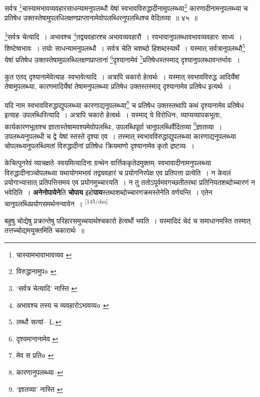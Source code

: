 \documentclass[article,12pt,a4paper]{memoir}
\begin{document}
	  \pstart सर्वत्र \footnote{चास्यामभावाभावव्यव \cite{dp-edE}}चास्यामभावव्यवहारसाधन्यामनुपलब्धौ येषां स्वभावविरुद्धादीनामुपलब्ध्या\footnote{विरुद्धानामुप० \cite{dp-msC}} कारणादीनामनुपलब्ध्या च प्रतिषेध उक्तस्तेषामुपलधिलक्षणप्राप्तानामेवोपलब्धिरनुपलब्धिश्च वेदितव्या ॥ ४५ ॥
	\pend
       

	  \pstart \footnote{‘सर्वत्र चेत्यादि’ नास्ति \cite{dp-edH} \cite{dp-edN}}सर्वत्र चेत्यादि । अभावश्च \footnote{अभावश्च तस्य च व्यवहारोऽभावव्य० \cite{dp-msA} \cite{dp-edP} \cite{dp-edH} \cite{dp-edE}}तद्व्यवहारश्च अभावव्यवहारौ । रवभावानुपलब्धावभावव्यवहारः साध्य । शिष्टेष्वभावः । तयोः साधन्यामनुपलब्धौ । सर्वत्र चेति चशब्दो हिशब्दस्यार्थे । यस्मात् सर्वत्रानुपलब्धौ\footnote{लब्धौ सत्यां--\cite{dp-msB} \cite{dp-edH} L.} येषां प्रतिषेध उक्तस्तेषामुपलब्धिलक्षणप्राप्तानां \footnote{दृश्यमानानामेव \cite{dp-msB}}दृश्यानामेवं \footnote{मेव स प्रति० \cite{dp-msA} \cite{dp-edP} \cite{dp-edH} \cite{dp-edE} \cite{dp-edN}}प्रतिषेधस्तस्माद् दृश्यानुपलब्धावन्तर्भावः ।
	\pend
       

	  \pstart कुत एतद् दृश्यानामेवेत्याह--स्वभावेत्यादि । अत्रापि चकारो हेत्वर्थः । यस्मात् स्वभावविरुद्ध आदिर्येषां तेषामुपलब्ध्या, कारणमादिर्येषां तेषामनुपलब्ध्या प्रतिषेध उक्तस्तस्माद् दृश्यानामेव प्रतिषेध इत्यर्थः ।
	\pend
       

	  \pstart यदि नाम स्वभावविरुद्धाद्युपलब्ध्या कारणाद्यनुपलब्ध्या\footnote{कारणानुपलब्ध्या--\cite{dp-msC}} च प्रतिषेध उक्तस्तथापि कथं दृश्यानामेव प्रतिषेध इत्याह--उपलब्धिरित्यादि । अत्रापि चकारो हेत्वर्थः । यस्माद् ये विरोधिनः, व्याप्यव्यापकभूताः, कार्यकारणभूताश्च ज्ञातास्तेषामवश्यमेवोपलब्धिः, उपलब्धिपूर्वा चानुपलब्धिर्वेदितव्या \footnote{‘ज्ञातव्या’ नास्ति \cite{dp-msA} \cite{dp-msB} \cite{dp-edP} \cite{dp-edH} \cite{dp-edE} \cite{dp-edN}}ज्ञातव्या । उपलब्ध्यनुपलब्धी च द्वे येषां स्तस्ते दृश्या एव । तस्मात् स्वभावविरुद्धाद्युपलब्ध्या कारणाद्यनुपलब्ध्या चोपलब्ध्यनुपलब्धिमतां विरुद्धादीनां प्रतिषेधः क्रियमाणो दृश्यानामेव कृतो द्रष्टव्यः ।
	\pend
      

	  \pstart केचित्पुनरेवं व्याचक्षते--स्वयमित्यादिना ग्रन्थेन वार्त्तिककृतेदमुक्तम्--स्वभावादीनामनुपलब्ध्या विरुद्धादीनाञ्चोपलब्ध्या यथायोगमभावं तद्व्यवहारं च प्रयोगनिरपेक्ष एव प्रतिपत्ता प्रत्येति । न केवलं प्रयोगाभ्यासात् प्रतिपत्तिसमय एव प्रयोगमुच्चारयति । न तु ततोऽपूर्वमवगच्छतीतरथा प्रतिनियतशब्दोच्चारणं न भवेदिति । \textbf{अनेनोपायेने}ति \textbf{चोपाय} इहो\textbf{पाय}स्तथाशब्दोच्चारणक्रमस्तेनेति वर्णयन्ति । एतेन चानुपलब्धिप्रयोगसमर्थनन्यायेन ।
	\pend
      \leavevmode\textsuperscript{\rmlatinfont\tiny [145/dm]}

	  \pstart बहुषु चोद्येषु प्रक्रान्तेषु परिहारसमुच्चयार्थश्चकारो हेत्वर्थो भवति । यस्मादिदं चेदं च समाधानमस्ति तस्मात् तत्तच्चोद्यमयुक्तमिति चकारार्थः ॥
	\pend
       
\end{document}
